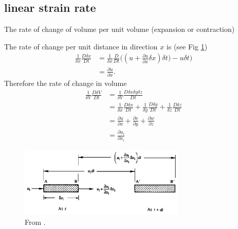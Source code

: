 \subsection{linear strain rate} \begin{defn*} The rate of change of volume per unit volume
(expansion or contraction) \end{defn*} \begin{derv*} The rate of change per unit distance in
direction $x$ is (see Fig \ref{fig:linearStrain}) \begin{equation} \begin{aligned} \frac{1}{\delta
x} \frac{D \delta x}{D t} & = \frac{1}{\delta x} \frac{D}{D t} \big((u + \frac{\partial u}{\partial
x} \delta x) \delta t \big) - u \delta t \big)\\ & = \frac{\partial u}{\partial x} .  \end{aligned}
\end{equation} Therefore the rate of change in volume \begin{equation} \begin{aligned}
\frac{1}{\delta V} \frac{D \delta V}{D t} & = \frac{1}{\delta V} \frac{D \delta x \delta y \delta
z}{D t} \\ & = \frac{1}{\delta x} \frac{D \delta x}{D t} + \frac{1}{\delta y} \frac{D \delta y}{D t}
+ \frac{1}{\delta z} \frac{D \delta z}{D t} \\ & = \frac{\partial u}{\partial x} + \frac{\partial
v}{\partial y} + \frac{\partial w}{\partial z} \\ & = \frac{\partial u_i}{\partial x_i}
\end{aligned} \end{equation}

\end{derv*} 
\begin{figure}[H] 
   \includegraphics[width=0.7\textwidth,height=0.3\textwidth]{linearStrain.png} 
   \caption{\label{fig:linearStrain} From \cite{kundu2008fluid}.  } 
\end{figure}

